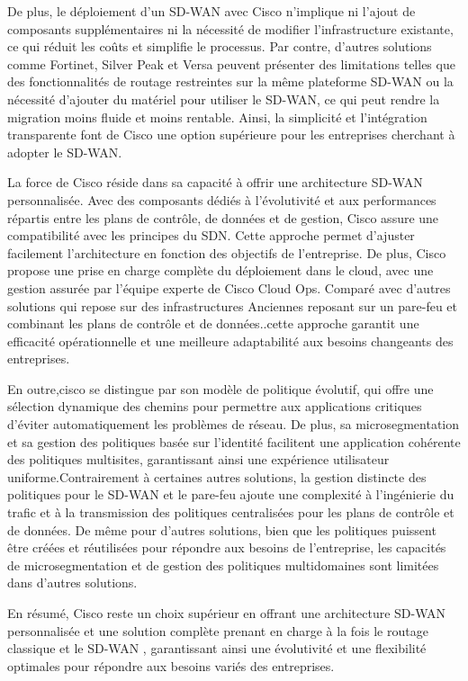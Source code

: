 De plus, le déploiement d'un SD-WAN avec Cisco n'implique ni l'ajout de composants supplémentaires ni la nécessité de modifier l’infrastructure existante, ce qui réduit les coûts et simplifie le processus. Par contre, d'autres solutions comme Fortinet, Silver Peak et Versa peuvent présenter des limitations telles que des fonctionnalités de routage restreintes sur la même plateforme SD-WAN ou la nécessité d'ajouter du matériel pour utiliser le SD-WAN, ce qui peut rendre la migration moins fluide et moins rentable. Ainsi, la simplicité et l'intégration transparente font de Cisco une option supérieure pour les entreprises cherchant à adopter le SD-WAN.

La force de Cisco réside dans sa capacité à offrir une architecture SD-WAN personnalisée. Avec des composants dédiés à l'évolutivité et aux performances répartis entre les plans de contrôle, de données et de gestion, Cisco assure une compatibilité avec les principes du SDN. Cette approche permet d'ajuster facilement l'architecture en fonction des objectifs de l'entreprise. De plus, Cisco propose une prise en charge complète du déploiement dans le cloud, avec une gestion assurée par l'équipe experte de Cisco Cloud Ops. Comparé avec  d'autres solutions  qui repose sur des infrastructures Anciennes reposant sur un pare-feu et combinant les plans de contrôle et de données..cette approche garantit une efficacité opérationnelle et une meilleure adaptabilité aux besoins changeants des entreprises.

En outre,cisco se distingue par son modèle de politique évolutif, qui offre une sélection dynamique des chemins pour permettre aux applications critiques d'éviter automatiquement les problèmes de réseau. De plus, sa microsegmentation et sa gestion des politiques basée sur l'identité facilitent une application cohérente des politiques multisites, garantissant ainsi une expérience utilisateur uniforme.Contrairement à certaines autres solutions, la gestion distincte des politiques pour le SD-WAN et le pare-feu ajoute une complexité à l'ingénierie du trafic et à la transmission des politiques centralisées pour les plans de contrôle et de données. De même pour d’autres solutions, bien que les politiques puissent être créées et réutilisées pour répondre aux besoins de l'entreprise, les capacités de microsegmentation et de gestion des politiques multidomaines sont limitées dans d'autres solutions.

En résumé, Cisco reste  un choix supérieur en offrant une architecture SD-WAN personnalisée et une solution complète prenant en charge à la fois le routage classique et le SD-WAN , garantissant ainsi une évolutivité et une flexibilité optimales pour répondre aux besoins variés des entreprises.
